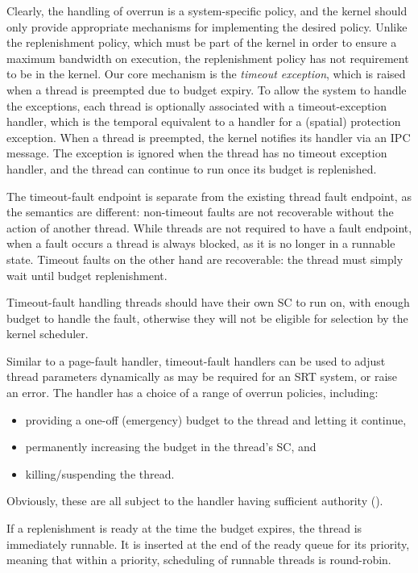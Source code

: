 Clearly, the handling of overrun is a system-specific policy, and the
kernel should only provide appropriate
mechanisms for implementing the desired policy. Unlike the replenishment policy, which must be part
of the kernel in order to ensure a maximum bandwidth on execution, the replenishment policy has not
requirement to be in the kernel. Our core mechanism is
the \emph{timeout exception}, which is raised when a thread is
preempted due to budget expiry. To allow the system to handle the exceptions, each thread
is optionally associated with a timeout-exception handler, which is
the temporal equivalent to a handler for a (spatial) protection exception. When a
thread is preempted, the kernel notifies its handler via an \gls{IPC} message. The
exception is ignored when the thread has no timeout exception handler, and the thread
can continue to run once its budget is replenished.

The timeout-fault
endpoint is separate from the existing thread fault endpoint, as the semantics are different:
non-timeout faults are not recoverable without the action of another thread. 
While threads are not required to have a fault endpoint, when a fault occurs a thread is always
blocked, as it is no longer in a runnable state. Timeout faults on the other hand are recoverable:
the thread must simply wait until budget replenishment. 

Timeout-fault handling threads should have their own \gls{SC} to run on, with enough budget to handle
the fault, otherwise they will not be eligible for selection by the kernel scheduler.

Similar to a page-fault handler, timeout-fault handlers can be used to adjust thread parameters
dynamically as may be required for an \gls{SRT} system, or raise an error.
The handler has a choice of a range of overrun policies, including:
\begin{itemize}
      \item providing a one-off (emergency) budget to the thread and letting it continue,
       \item permanently increasing the budget in the thread's SC, and
       \item killing/suspending the thread.
       \end{itemize}
Obviously, these are all subject to the handler having sufficient
authority (\eg \schedcontrol).

If a replenishment is ready at the time the budget expires, the thread
is immediately runnable. It is inserted at the end of the ready queue
for its priority, meaning that within a priority, scheduling of
runnable threads is round-robin.

